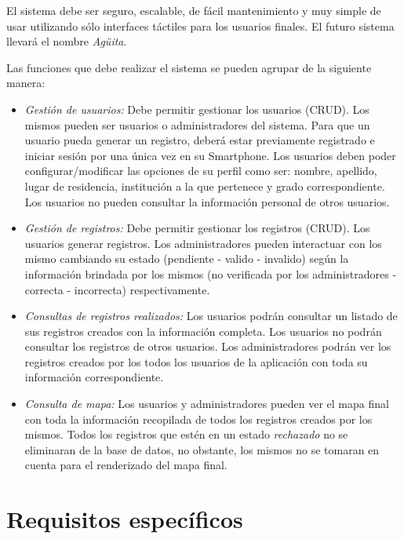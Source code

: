       El sistema debe ser seguro, escalable, de fácil mantenimiento y muy simple de usar utilizando sólo interfaces táctiles para los usuarios finales. El futuro sistema llevará el nombre \emph{Agüita}.

      Las funciones que debe realizar el sistema se pueden agrupar de la siguiente manera:

      \begin{itemize}

        \item \emph{Gestión de usuarios:} Debe permitir gestionar los usuarios (CRUD). Los mismos pueden ser usuarios o administradores del sistema.
        Para que un usuario pueda generar un registro, deberá estar previamente registrado e iniciar sesión por una única vez en su Smartphone.
        Los usuarios deben poder configurar/modificar las opciones de su perfil como ser: nombre, apellido, lugar de residencia, institución a la que pertenece y grado correspondiente.
        Los usuarios no pueden consultar la información personal de otros usuarios.

        \item \emph{Gestión de registros:} Debe permitir gestionar los registros (CRUD). Los usuarios generar registros. Los administradores pueden interactuar con los mismo cambiando su estado (pendiente - valido - invalido) según la información brindada por los mismos (no verificada por los administradores - correcta - incorrecta) respectivamente.

        \item \emph{Consultas de registros realizados:} Los usuarios podrán consultar un listado de sus registros creados con la información completa.
        Los usuarios no podrán consultar los registros de otros usuarios.
        Los administradores podrán ver los registros creados por los todos los usuarios de la aplicación con toda su información correspondiente.

        \item \emph{Consulta de mapa:} Los usuarios y administradores pueden ver el mapa final con toda la información recopilada de todos los registros creados por los mismos.
        Todos los registros que estén en un estado \emph{rechazado} no se eliminaran de la base de datos, no obstante, los mismos no se tomaran en cuenta para el renderizado del mapa final. 

      \end{itemize}

  \section{Requisitos específicos}

